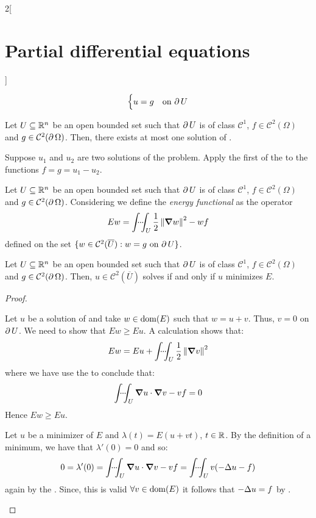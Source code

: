 \documentclass[../../../main_math.tex]{subfiles}
\begin{document}
\begin{multicols}{2}[\section{Partial differential equations}]
\begin{definition}
\begin{equation}
\begin{cases}
        u=g                & \text{on $\operatorname{\partial}{U}$}
      \end{cases}
    \end{equation}
  \end{definition}
  \begin{proposition}
    Let $U\subseteq \mathbb{R}^n$ be an open bounded set such that $\operatorname{\partial}{U}$ is of class $\mathcal{C}^1$, $f\in\mathcal{C}^2(\Omega)$ and $g\in\mathcal{C}^2(\operatorname{\partial}{\Omega})$. Then, there exists at most one solution of .
  \end{proposition}
  \begin{sproof}
    Suppose $u_1$ and $u_2$ are two solutions of the problem. Apply the first of the  to the functions $f = g = u_1-u_2$.
  \end{sproof}
  \begin{definition}
    Let $U\subseteq \mathbb{R}^n$ be an open bounded set such that $\operatorname{\partial}{U}$ is of class $\mathcal{C}^1$, $f\in\mathcal{C}^2(\Omega)$ and $g\in\mathcal{C}^2(\operatorname{\partial}{\Omega})$. Considering  we define the \emph{energy functional} as the operator $$Ew=\idotsint_U\frac{1}{2}\left\|\grad w\right\|^2 - wf$$
    defined on the set $\{w\in\mathcal{C}^2(\overline{U}): w=g\text{ on $\operatorname{\partial}{U}$}\}$.
  \end{definition}
  \begin{theorem}
    Let $U\subseteq \mathbb{R}^n$ be an open bounded set such that $\operatorname{\partial}{U}$ is of class $\mathcal{C}^1$, $f\in\mathcal{C}^2(\Omega)$ and $g\in\mathcal{C}^2(\operatorname{\partial}{\Omega})$. Then, $u\in\mathcal{C}^2(\overline{U})$ solves  if and only if $u$ minimizes $E$.
  \end{theorem}
  \begin{proof}
    \begin{itemizeiff}
      Let $u$ be a solution of  and take $w\in \operatorname{dom}(E)$ such that $w=u+v$. Thus, $v=0$ on $\operatorname{\partial}{U}$. We need to show that $Ew\geq Eu$. A calculation shows that: $$Ew=Eu+\idotsint_U\frac{1}{2}\left\|\grad v\right\|^2$$ where we have use the  to conclude that: $$\idotsint_U\grad u\cdot\grad v-vf=0$$
      Hence $Ew\geq Eu$.
      \item Let $u$ be a minimizer of $E$ and $\lambda(t)=E(u+vt)$, $t\in \mathbb{R}$. By the definition of a minimum, we have that $\lambda'(0)=0$ and so:
      $$0 = \lambda'(0)=\idotsint_U\grad u\cdot\grad v-vf=\idotsint_Uv(-\Delta u-f)$$
      again by  the . Since, this is valid $\forall v\in\operatorname{dom}(E)$ it follows that $-\Delta u = f$ by .
    \end{itemizeiff}
  \end{proof}

\end{multicols}
\end{document}
